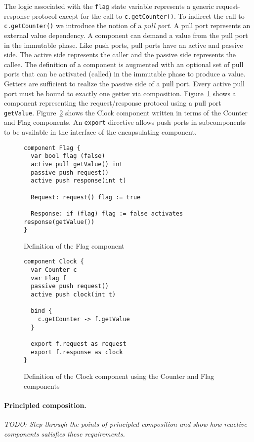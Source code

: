 The logic associated with the \verb+flag+ state variable represents a generic request-response protocol except for the call to \verb+c.getCounter()+.
To indirect the call to \verb+c.getCounter()+ we introduce the notion of a \emph{pull port}.
A pull port represents an external value dependency.
A component can demand a value from the pull port in the immutable phase.
Like push ports, pull ports have an active and passive side.
The active side represents the caller and the passive side represents the callee.
The definition of a component is augmented with an optional set of pull ports that can be activated (called) in the immutable phase to produce a value.
Getters are sufficient to realize the passive side of a pull port.
Every active pull port must be bound to exactly one getter via composition.
Figure~\ref{flag_component} shows a component representing the request/response protocol using a pull port \verb+getValue+.
Figure~\ref{factored2_clock_component} shows the Clock component written in terms of the Counter and Flag components.
An \verb+export+ directive allows push ports in subcomponents to be available in the interface of the encapsulating component.

\begin{figure}
\begin{verbatim}
component Flag {
  var bool flag (false)
  active pull getValue() int
  passive push request()
  active push response(int t)

  Request: request() flag := true

  Response: if (flag) flag := false activates response(getValue())
}
\end{verbatim}
\caption{Definition of the Flag component\label{flag_component}}
\end{figure}

\begin{figure}
\begin{verbatim}
component Clock {
  var Counter c
  var Flag f
  passive push request()
  active push clock(int t)

  bind {
    c.getCounter -> f.getValue
  }

  export f.request as request
  export f.response as clock
}
\end{verbatim}
\caption{Definition of the Clock component using the Counter and Flag components\label{factored2_clock_component}}
\end{figure}

\paragraph{Principled composition.}
\emph{TODO:  Step through the points of principled composition and show how reactive components satisfies these requirements.}

